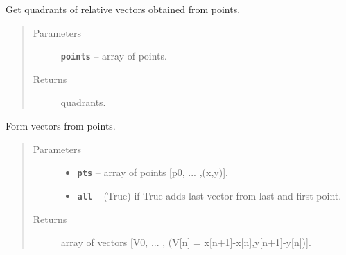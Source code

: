 \documentclass[letterpaper,10pt,english]{sphinxmanual}
\begin{document}

\begin{fulllineitems}
\label{RRtoolbox.lib.arrayops:RRtoolbox.lib.arrayops.basic.relativeQuadrants}
Get quadrants of relative vectors obtained from points.
\begin{quote}\begin{description}
\item[{Parameters}] \leavevmode
\textbf{\texttt{points}} -- array of points.

\item[{Returns}] \leavevmode
quadrants.

\end{description}\end{quote}

\end{fulllineitems}


\begin{fulllineitems}
\label{RRtoolbox.lib.arrayops:RRtoolbox.lib.arrayops.basic.relativeVectors}
Form vectors from points.
\begin{quote}\begin{description}
\item[{Parameters}] \leavevmode\begin{itemize}
\item {} 
\textbf{\texttt{pts}} -- array of points {[}p0, ... ,(x,y){]}.

\item {} 
\textbf{\texttt{all}} -- (True) if True adds last vector from last and first point.

\end{itemize}

\item[{Returns}] \leavevmode
array of vectors {[}V0, ... , (V{[}n{]} = x{[}n+1{]}-x{[}n{]},y{[}n+1{]}-y{[}n{]}){]}.

\end{description}\end{quote}

\end{fulllineitems}

\end{document}
